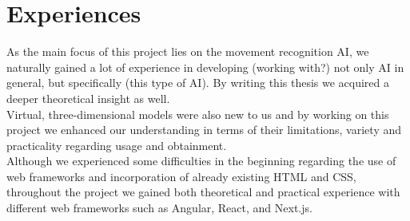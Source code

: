 \section{Experiences}
As the main focus of this project lies on the movement recognition AI, we naturally gained a lot of experience in developing
(working with?) not only AI in general, but specifically (this type of AI). By writing this thesis we acquired a deeper
theoretical insight as well. \\
Virtual, three-dimensional models were also new to us and by working on this project we enhanced our understanding in terms
of their limitations, variety and practicality regarding usage and obtainment. \\
Although we experienced some difficulties in the beginning regarding the use of web frameworks and incorporation of already
existing HTML and CSS, throughout the project we gained both theoretical and practical experience with different web frameworks
such as Angular, React, and Next.js.